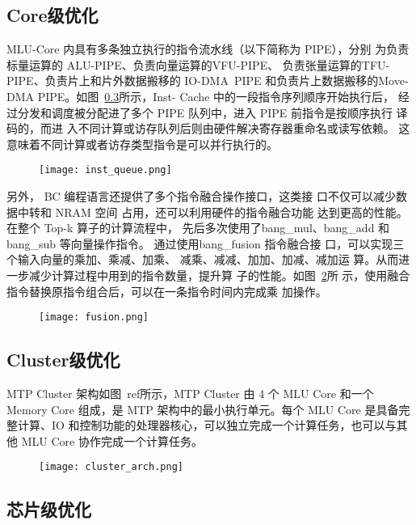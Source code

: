 \subsection{Core级优化}
MLU-Core 内具有多条独立执行的指令流水线（以下简称为 PIPE），分别 为负责标量运算的 ALU-PIPE、负责向量运算的VFU-PIPE、
负责张量运算的TFU-PIPE、负责片上和片外数据搬移的 IO-DMA\ PIPE 和负责片上数据搬移的Move-DMA PIPE。如图~\ref{}所示，Inst-
Cache 中的一段指令序列顺序开始执行后， 经过分发和调度被分配进了多个 PIPE 队列中，进入 PIPE 前指令是按顺序执行 译码的，而进
入不同计算或访存队列后则由硬件解决寄存器重命名或读写依赖。 这意味着不同计算或者访存类型指令是可以并行执行的。
\begin{figure}[ht]
    \centering
    \texttt{[image: inst\_queue.png]}
    \caption{}
    \label{fig:inst_queue}
\end{figure}

另外，
BC 编程语言还提供了多个指令融合操作接口，这类接 口不仅可以减少数据中转和 NRAM 空间
占用，还可以利用硬件的指令融合功能 达到更高的性能。在整个 Top-k 算子的计算流程中，
先后多次使用了bang\_mul、bang\_add 和 bang\_sub 等向量操作指令。
通过使用bang\_fusion 指令融合接 口，可以实现三个输入向量的乘加、乘减、加乘、
减乘、减减、加加、加减、减加运 算。从而进一步减少计算过程中用到的指令数量，提升算
子的性能。如图~\ref{fig:fusion}所 示，使用融合指令替换原指令组合后，可以在一条指令时间内完成乘
加操作。
\begin{figure}[ht]
    \centering
    \texttt{[image: fusion.png]}
    \caption{}
    \label{fig:fusion}
\end{figure}

\subsection{Cluster级优化}
MTP Cluster 架构如图~ref{}所示，MTP Cluster 由 4 个 MLU Core 和一个 Memory Core 组成，是 MTP 架构中的最小执行单元。每个 MLU Core 是具备完整计算、IO 和控制功能的处理器核心，可以独立完成一个计算任务，也可以与其他 MLU Core 协作完成一个计算任务。

\begin{figure}[ht]
    \centering
    \texttt{[image: cluster\_arch.png]}
    \caption{}
    \label{fig:cluster_arch}
\end{figure}
\subsection{芯片级优化}

